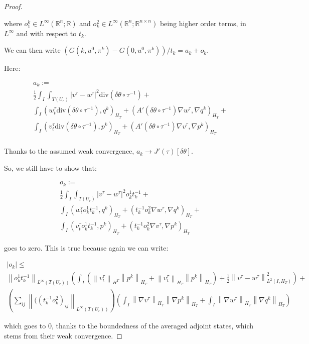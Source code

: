 \documentclass[english,a4paper,10pt,oneside]{scrbook}	%
\theoremstyle{break}
\newenvironment{mproof}[1][\proofname]{%
  \begin{proof}[#1]$ $\par\nobreak\ignorespaces
}{%
  \end{proof}
}
\renewcommand*{\proofname}{Proof}
\theoremstyle{remark}
\newcommand{\mR}{\mathbb{R}}
\newcommand{\norm}[1]{\left\lVert#1\right\rVert}
\newcommand{\te}{\theta}
\newcommand{\dive}{\text{div}}
\begin{document}
\begin{mproof}
where $o_1^k \in L^\infty(\mR^n;\mR)$ and $o^2_k \in L^\infty(\mR^n;\mR^{n\times n})$ being higher order terms, in $L^\infty$ and with respect to $t_k$.

We can then write $(G(k,u^0,\pi^k)-G(0,u^0,\pi^k))/t_k = a_k + o_k$.

Here:

\begin{align*}
a_k :=\\
\frac{1}{2}\int_I \int_{T(U_r)}|v^\tau-w^\tau|^2\dive(\delta \te \circ \tau^{-1})+\\
\int_I ( w_t^\tau \dive(\delta \te \circ \tau^{-1}), q^k)_{H_T}+ (A'(\delta \te \circ \tau^{-1}) \nabla w^\tau, \nabla q^k)_{H_T}+\\
\int_I (v_t^\tau \dive(\delta \te \circ \tau^{-1}),p^k )_{H_T} + (A'(\delta \te \circ \tau^{-1})  \nabla v^\tau, \nabla p^k)_{H_T} \\
\end{align*}

Thanks to the assumed weak convergence, $a_k\rightarrow J'(\tau)[\delta \te]$.

So, we still have to show that:

\begin{align*}
o_k:=\\
\frac{1}{2}\int_I \int_{T(U_r)}|v^\tau-w^\tau|^2 o^1_k t_k^{-1}+\\
\int_I ( w_t^\tau o^1_kt_k^{-1}, q^k)_{H_T}+ (t_k^{-1}o^2_k\nabla w^\tau, \nabla q^k)_{H_T}+\\
\int_I (v_t^\tau o^1_k t_k^{-1},p^k )_{H_T} + (t_k^{-1}o^2_k \nabla v^\tau, \nabla p^k)_{H_T} 
\end{align*}

goes to zero. This is true because again we can write:

\begin{align*}
|o_k| \leq\\ \norm{ o^1_kt_k^{-1}}_{L^\infty(T(U_r))}\left (\int_I( \norm{v_t^\tau}_{H^T}\norm{p^k}_{H_T}+ \norm{v_t^\tau}_{H_T}\norm{p^k}_{H_T})+\frac{1}{2}\norm{v^\tau-w^\tau}^2_{L^2(I,H_T)}\right )+\\
\left(\sum_{ij} \norm{((t_k^{-1}o^2_k)_{ij}}_{L^\infty(T(U_r))}\right )\left (
\int_I \norm{\nabla v^\tau}_{H_T} \norm{\nabla p^k}_{H_T}+ \int_I \norm{\nabla w^\tau}_{H_T} \norm{\nabla q^k}_{H_T}\right )
\end{align*}

which goes to $0$, thanks to the boundedness of the averaged adjoint states, which stems from their weak convergence.


\end{mproof}
\end{document}
